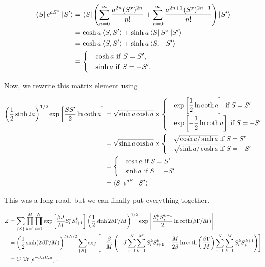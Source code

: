\documentclass[11pt,openany]{article}
\begin{document}
\begin{align*}
	\bra{S}e^{aS^x}\ket{S'} &= \bra{S}\left(\sum_{n=0}^\infty\frac{a^{2n}(S^x)^{2n}}{n!} + \sum_{n=0}^\infty\frac{a^{2n+1}(S^x)^{2n+1}}{n!}\right)\ket{S'}\\
	&= \cosh{a}\braket{S,S'} + \sinh{a}\bra{S}S^x\ket{S'}\\
	&= \cosh{a}\braket{S,S'} + \sinh{a}\braket{S,-S'}\\
	&= \begin{cases}
		&\cosh{a} \text{ if } S=S',\\
		&\sinh{a} \text{ if } S=-S'.
	\end{cases}
\end{align*}

Now, we rewrite this matrix element using

\begin{align*}
	\left(\frac{1}{2}\sinh{2a}\right)^{1/2}\exp\left[\frac{SS'}{2}\ln\coth{a}\right] &= \sqrt{\sinh{a}\cosh{a}}\times
		\begin{cases}
			&\exp\left[\dfrac{1}{2}\ln\coth{a}\right] \text{ if } S=S'			\vspace{1mm}\\
			&\exp\left[-\dfrac{1}{2}\ln\coth{a}\right] \text{ if } S=-S'
		\end{cases}\\
	& = \sqrt{\sinh{a}\cosh{a}}\times
	\begin{cases}
		&\sqrt{\cosh{a}/\sinh{a}} \text{ if } S=S'\\
		&\sqrt{\sinh{a}/\cosh{a}} \text{ if } S=-S'
	\end{cases}\\
	&= \begin{cases}
		&\cosh{a} \text{ if } S=S'\\
		&\sinh{a} \text{ if } S=-S'
	\end{cases}\\
	&= \bra{S}e^{aS^x}\ket{S'}
\end{align*}

This was a long road, but we can finally put everything together.

\begin{align*}
	Z &= \sum_{\left\{S\right\}}\prod_{k=1}^M\prod_{i=1}^N\exp\left[\frac{\beta J}{M}S_i^kS_{i+1}^k\right]\left(\frac{1}{2}\sinh{2\beta\Gamma/M}\right)^{1/2}\exp\left[\frac{S_i^kS_i^{k+1}}{2}\ln\coth(\beta\Gamma/M)\right]\\
	&= \left(\frac{1}{2}\sinh(2\beta\Gamma/M)\right)^{MN/2}\sum_{\left\{S\right\}}\exp\left[-\frac{\beta}{M}\left(-J\sum_{i=1}^N\sum_{k=1}^M S_i^k S_{i+1}^k - \frac{M}{2\beta}\ln\coth\left(\dfrac{\beta\Gamma}{M}\right)\sum_{i=1}^N\sum_{k=1}^M S_i^k S_i^{k+1}\right)\right]\\
	&= C\hspace{1mm}\mathrm{Tr}\left[e^{-\beta_\mathrm{cl}H_\mathrm{eff}}\right],
\end{align*}
\end{document}
